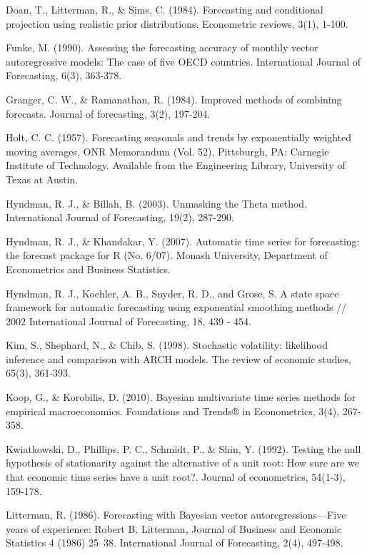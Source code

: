 \begin{thebibliography}{99}
Doan, T., Litterman, R., \& Sims, C. (1984). Forecasting and conditional projection using realistic prior distributions. Econometric reviews, 3(1), 1-100.

Funke, M. (1990). Assessing the forecasting accuracy of monthly vector autoregressive models: The case of five OECD countries. International Journal of Forecasting, 6(3), 363-378.

Granger, C. W., \& Ramanathan, R. (1984). Improved methods of combining forecasts. Journal of forecasting, 3(2), 197-204.

Holt, C. C. (1957). Forecasting seasonals and trends by exponentially weighted moving averages, ONR Memorandum (Vol. 52), Pittsburgh, PA: Carnegie Institute of Technology. Available from the Engineering Library, University of Texas at Austin.

Hyndman, R. J., \& Billah, B. (2003). Unmasking the Theta method. International Journal of Forecasting, 19(2), 287-290.

Hyndman, R. J., \& Khandakar, Y. (2007). Automatic time series for forecasting: the forecast package for R (No. 6/07). Monash University, Department of Econometrics and Business Statistics.

Hyndman, R. J., Koehler, A. B., Snyder, R. D., and Grose, S. A state space framework for automatic forecasting using exponential smoothing methods // 2002 International Journal of Forecasting, 18, 439 - 454.

Kim, S., Shephard, N., \& Chib, S. (1998). Stochastic volatility: likelihood inference and comparison with ARCH models. The review of economic studies, 65(3), 361-393.

Koop, G., \& Korobilis, D. (2010). Bayesian multivariate time series methods for empirical macroeconomics. Foundations and Trends® in Econometrics, 3(4), 267-358.

Kwiatkowski, D., Phillips, P. C., Schmidt, P., \& Shin, Y. (1992). Testing the null hypothesis of stationarity against the alternative of a unit root: How sure are we that economic time series have a unit root?. Journal of econometrics, 54(1-3), 159-178.

Litterman, R. (1986). Forecasting with Bayesian vector autoregressions—Five years of experience: Robert B. Litterman, Journal of Business and Economic Statistics 4 (1986) 25–38. International Journal of Forecasting, 2(4), 497-498.


\end{thebibliography}
